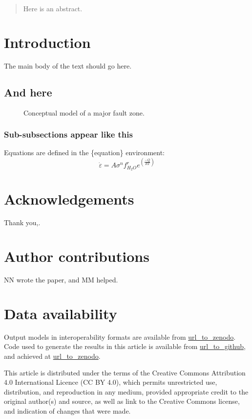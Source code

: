 \documentclass{tektonika}
\begin{document}
\maketitle
\thispagestyle{firststyle}

\begin{abstract}
Here is an abstract. 
\end{abstract}



\section{Introduction}
The main body of the text should go here.

\subsection{And here}



\begin{figure}[h!]\centering
\caption{Conceptual model of a major fault zone.}
\label{fig:1}
\end{figure}

\subsubsection{Sub-subsections appear like this}

Equations are defined in the \{equation\} environment:
 \begin{equation}
\dot{\varepsilon} = A\sigma^{n} f_{H_{2}O}^{r} e^{({\frac{-Q}{RT}})}
\end{equation}


\section*{Acknowledgements} %
Thank you,.

\section*{Author contributions} %
NN wrote the paper, and MM helped. 


\section*{Data availability}
Output models in interoperability formats are available from \url{url_to_zenodo}. Code used to generate the results in this article is available from \url{url_to_github}, and achieved at \url{url_to_zenodo}. 


This article is distributed under the terms of the Creative Commons Attribution 4.0 International Licence (CC BY 4.0), which permits unrestricted use, distribution, and reproduction in any medium, provided appropriate credit to the original author(s) and source, as well as link to the Creative Commons license, and indication of changes that were made.


\end{document}
